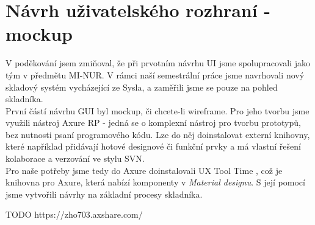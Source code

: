 \section{Návrh uživatelského rozhraní - mockup}

V poděkování jsem zmiňoval, že při prvotním návrhu UI jsme spolupracovali jako tým v předmětu MI-NUR. V rámci naší semestrální práce jsme navrhovali nový skladový systém vycházející ze Sysla, a zaměřili jsme se pouze na pohled skladníka.\\
První částí návrhu GUI byl mockup, či chcete-li wireframe. Pro jeho tvorbu jsme využili nástroj Axure RP \cite{axure} - jedná se o komplexní nástroj pro tvorbu prototypů, bez nutnosti psaní programového kódu. Lze do něj doinstalovat externí knihovny, které například přidávají hotové designové či funkční prvky a má vlastní řešení kolaborace a verzování ve stylu SVN.\\
Pro naše potřeby jsme tedy do Axure doinstalovali UX Tool Time \cite{uxtooltime}, což je knihovna pro Axure, která nabízí komponenty v \emph{Material designu}. S její pomocí jsme vytvořili návrhy na základní procesy skladníka.

TODO
https://zho703.axshare.com/
